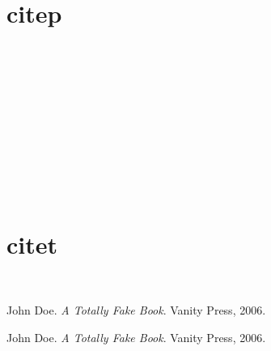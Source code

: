 \part{citep }
\label{citep}

~\citep{foo1}

~\citep{foo1}

~\citep[p. 123]{foo1}

~\citep{foo1}

~\citep[foo][bar]{foo1}

~\citep{foo1}~\citep{foo2}

\part{citet }
\label{citet}

\citet{foo1}

\citet{foo1}

\citet[p. 123]{foo1}

\citet{foo1}

\citet[foo][bar]{foo1}

\citet{foo1}\citet{foo2}

~\nocite{foo2}

\begin{thebibliography}{0}

John Doe. \emph{A Totally Fake Book}. Vanity Press, 2006.

John Doe. \emph{A Totally Fake Book}. Vanity Press, 2006.

\end{thebibliography}
